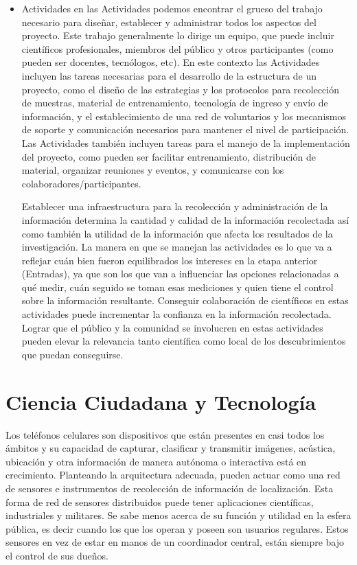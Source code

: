 \begin{itemize}
		\item {Actividades}
		en las Actividades podemos encontrar el grueso del trabajo necesario para diseñar, establecer y administrar todos los aspectos del proyecto. Este trabajo generalmente lo dirige un equipo, que puede incluir científicos profesionales, miembros del público y otros participantes (como pueden ser docentes, tecnólogos, etc). En este contexto las Actividades incluyen las tareas necesarias para el desarrollo de la estructura de un proyecto, como el diseño de las estrategias y los protocolos para recolección de muestras, material de entrenamiento, tecnología de ingreso y envío de información, y el establecimiento de una red de voluntarios y los mecanismos de soporte y comunicación necesarios para mantener el nivel de participación. Las Actividades también incluyen tareas para el manejo de la implementación del proyecto, como pueden ser facilitar entrenamiento, distribución de material, organizar reuniones y eventos, y comunicarse con los colaboradores/participantes.
		
		Establecer una infraestructura para la recolección y administración de la información determina la cantidad y calidad de la información recolectada así como también la utilidad de la información que afecta los resultados de la investigación. La manera en que se manejan las actividades es lo que va a reflejar cuán bien fueron equilibrados los intereses en la etapa anterior (Entradas), ya que son los que van a influenciar las opciones relacionadas a qué medir, cuán seguido se toman esas mediciones y quien tiene el control sobre la información resultante. Conseguir colaboración de científicos en estas actividades puede incrementar la confianza en la información recolectada. Lograr que el público y la comunidad se involucren en estas actividades pueden elevar la relevancia tanto científica como local de los descubrimientos que puedan conseguirse. 
		
		
\end{itemize}	


\section{Ciencia Ciudadana y Tecnología}

	Los teléfonos celulares son dispositivos que están presentes en casi todos los ámbitos y su capacidad de capturar, clasificar y transmitir imágenes, acústica, ubicación y otra información de manera autónoma o interactiva está en crecimiento.
Planteando la arquitectura adecuada, pueden actuar como una red de sensores e instrumentos de recolección de información de localización. 
Esta forma de red de sensores distribuidos puede tener aplicaciones científicas, industriales y militares. Se sabe menos acerca de su función y utilidad en la esfera pública, es decir cuando los que los operan y poseen son usuarios regulares.   Estos sensores en vez de estar en manos de un coordinador central, están siempre bajo el control de sus dueños.

